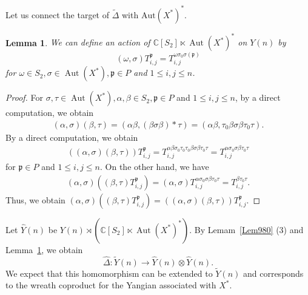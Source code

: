 \documentclass{article}
\newtheorem{Lemma}[equation]{Lemma}
\theoremstyle{definition}
\theoremstyle{remark}
\numberwithin{equation}{section}
\DeclareMathOperator{\Aut}{Aut}
\numberwithin{equation}{section}
\begin{document}
Let us connect the target of $\widetilde{\Delta}$ with $\text{Aut}(X^*)^*$.
\begin{Lemma}\label{Lem981}
We can define an action of $\mathbb{C}[S_2]\ltimes\Aut(X^*)^\ast$ on $Y(n)$ by
\[
(\omega,\sigma)T^{\mathfrak{p}}_{i,j}=T^{\omega\sigma_0\sigma(\mathfrak{p})}_{i,j}
\]
for $\omega\in S_2,\sigma\in\Aut(X^*),\mathfrak{p}\in P$ and $1\leq i,j\leq n$.
\end{Lemma}
\begin{proof}
For $\sigma,\tau\in\Aut(X^*),\alpha,\beta\in S_2,\mathfrak{p}\in P$ and $1\leq i,j\leq n$, by a direct computation, we obtain
\begin{align*}
(\alpha,\sigma)(\beta,\tau)=(\alpha\beta,(\beta\sigma\beta)\ast\tau)=(\alpha\beta,\tau_0\beta\sigma\beta\tau_0\tau).
\end{align*}
By a direct computation, we obtain
\begin{align*}
((\alpha,\sigma)(\beta,\tau))T^{\mathfrak{p}}_{i,j}=T^{\alpha\beta\sigma_0\tau_0\tau_0\beta\sigma\beta\tau_0\tau}_{i,j}=T^{\alpha\sigma_0\sigma\beta\tau_0\tau}_{i,j}
\end{align*}
for $\mathfrak{p}\in P$ and $1\leq i,j\leq n$. On the other hand, we have
\begin{align*}
(\alpha,\sigma)((\beta,\tau)T^{\mathfrak{p}}_{i,j})=(\alpha,\sigma)T^{\alpha\sigma_0\sigma\beta\tau_0\tau}_{i,j}=T^{\beta\tau_0\tau}_{i,j}.
\end{align*}
Thus, we obtain $(\alpha,\sigma)((\beta,\tau)T^{\mathfrak{p}}_{i,j})=((\alpha,\sigma)(\beta,\tau))T^{\mathfrak{p}}_{i,j}$.
\end{proof}
Let $\widehat{Y}(n)$ be $Y(n)\rtimes(\mathbb{C}[S_2]\ltimes\Aut(X^*)^\ast)$. By Lemam~\ref{Lem980} (3) and Lemma~\ref{Lem981}, we obtain
\[
\widehat{\Delta}\colon \widetilde{Y}(n)\to\widehat{Y}(n)\otimes\widehat{Y}(n).
\]
We expect that this homomorphism can be extended to $\widetilde{Y}(n)$ and corresponds to the wreath coproduct for the Yangian associated with $X^*$.
\end{document}
